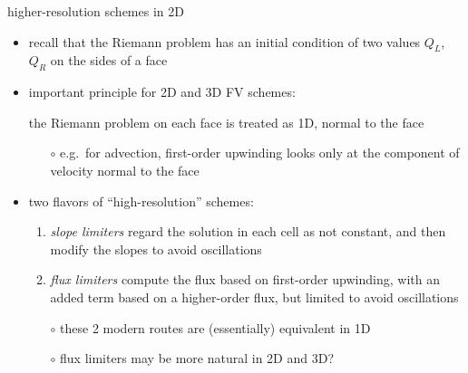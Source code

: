 \documentclass[10pt,dvipsnames,usepdftitle=false,
hyperref={pdftitle = {Finite volume methods},
    pdfauthor = {Ed Bueler}}]{beamer}
\begin{document}
\begin{frame}{higher-resolution schemes in 2D}

\begin{itemize}
\item recall that the Riemann problem has an initial condition of two values $Q_L$, $Q_R$ on the sides of a face
\item important principle for 2D and 3D FV schemes:

\bigskip
\hfill \alert{the Riemann problem on each face is treated as 1D, normal to the face}

\bigskip
    \begin{itemize}
    \item[$\circ$] e.g.~for advection, first-order upwinding looks only at the component of velocity normal to the face
    \end{itemize}
\item two flavors of ``high-resolution'' schemes:
    \begin{enumerate}
    \item \emph{slope limiters} regard the solution in each cell as not constant, and then modify the slopes to avoid oscillations
    \item \emph{flux limiters} compute the flux based on first-order upwinding, with an added term based on a higher-order flux, but limited to avoid oscillations
    \end{enumerate}
    \begin{itemize}
    \item[$\circ$] these 2 modern routes are (essentially) equivalent in 1D
    \item[$\circ$] flux limiters may be more natural in 2D and 3D?
    \end{itemize}
\end{itemize}
\end{frame}
\end{document}
